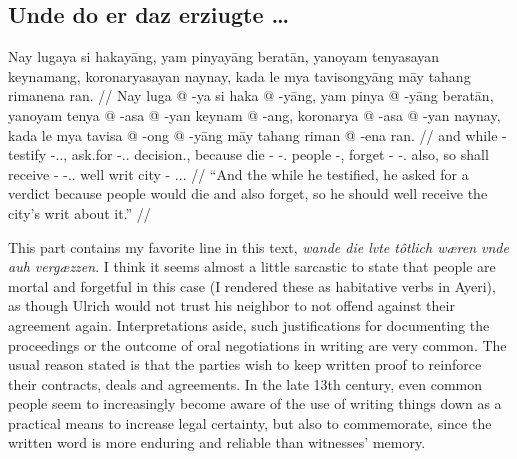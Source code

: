 \documentclass[12pt,paper=a4]{scrartcl}
\newcommand{\fw}[1]{\textit{#1}} %
\begin{document}
\subsection*{Unde do er daz erziugte …}


\ex \begingl
	\glpreamble Nay lugaya si hakayāng, yam pinyayāng beratān, yanoyam 
		tenyasayan keynamang, koronaryasayan naynay, kada le mya 
		tavisongyāng māy tahang rimanena ran. //
	\gla Nay luga @ -ya si haka @ -yāng, yam pinya @ -yāng beratān, yanoyam 
		tenya @ -asa @ -yan keynam @ -ang, koronarya @ -asa @ -yan 
		naynay, kada le mya tavisa @ -ong @ -yāng māy tahang riman @ 
		-ena ran. //
	\glb and while -\Loc{} \Rel{} testify -\Tsg{}.\M{}.\Aarg{}, \DatT{} 
		ask.for -\Tsg{}.\M{}.\Aarg{} decision.\Top{}, because die 
		-\Hab{} -\Tpl{}.\M{} people -\Aarg{}, forget -\Hab{} 
		-\Tpl{}.\M{} also, so \PatT{} shall receive -\Irr{} 
		-\Tsg{}.\M{}.\Aarg{} well writ city -\Gen{} 
		\Tsg{}.\Inan{}.\Gen{}. //
	\glft \enquote{And the while he testified, he asked for a verdict 
		because people would die and also forget, so he should well 
		receive the city's writ about it.} //
\endgl \xe

This part contains my favorite line in this text, \fw{wande die lvte tôtlich 
wæren vnde auh vergæzzen}. I think it seems almost a little sarcastic to state 
that people are mortal and forgetful in this case (I rendered these as 
habitative verbs in Ayeri), as though Ulrich would not trust his neighbor to not 
offend against their agreement again. Interpretations aside, such justifications 
for documenting the proceedings or the outcome of oral negotiations in writing 
are very common. The usual reason stated is that the parties wish to keep 
written proof to reinforce their contracts, deals and agreements. In the late 
13th century, even common people seem to increasingly become aware of the use 
of writing things down as a practical means to increase legal certainty, but 
also to commemorate, since the written word is more enduring and reliable than 
witnesses' memory.
\end{document}

